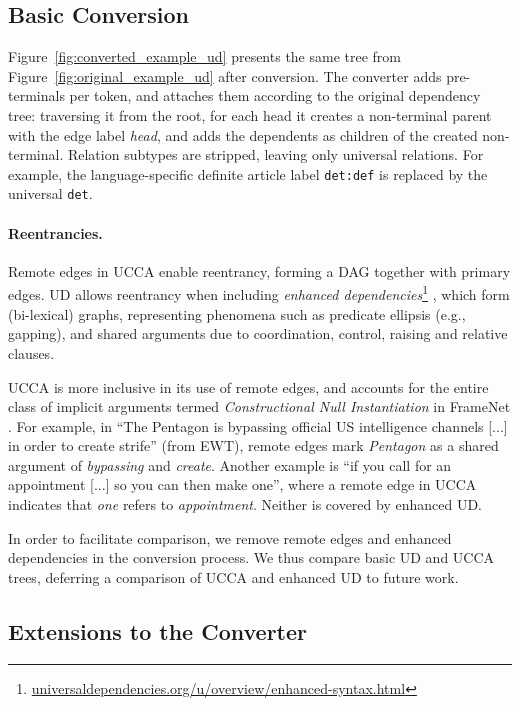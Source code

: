 \documentclass[11pt,a4paper]{article}
\begin{document}
\subsection{Basic Conversion}\label{sec:conversion}

Figure~\ref{fig:converted_example_ud} presents the same tree from Figure~\ref{fig:original_example_ud}
after conversion.
The converter adds pre-terminals per token,
and attaches them according to the original dependency tree:
traversing it from the root, for each head it creates a non-terminal
parent with the edge label {\it head}, and adds the dependents as children of 
the created non-terminal.
Relation subtypes are stripped,
leaving only universal relations.
For example, the language-specific definite article label
\texttt{det:def} is replaced by the universal \texttt{det}.

\paragraph{Reentrancies.}
Remote edges in UCCA enable reentrancy, forming a DAG together with primary edges.
UD allows reentrancy when including \textit{enhanced dependencies}\footnote{\url{universaldependencies.org/u/overview/enhanced-syntax.html}}
\cite{SCHUSTER16.779}, which form (bi-lexical) graphs, representing phenomena
such as predicate ellipsis (e.g., gapping),
and shared arguments due to coordination, control, raising and relative clauses.

UCCA is more inclusive in its use of remote edges, and accounts for 
the entire class of implicit arguments termed {\it Constructional Null Instantiation} in FrameNet \citep{Ruppenhofer:16}.
For example, in
``The Pentagon is bypassing official US intelligence channels [...] in order to create strife'' (from EWT),
remote edges mark \textit{Pentagon} as a shared argument of \textit{bypassing} and
\textit{create}. 
Another example is ``if you call for an appointment [...] so you can then make one'',
where a remote edge in UCCA indicates that \textit{one} refers to \textit{appointment}.
Neither is covered by enhanced UD.

In order to facilitate comparison, we remove remote edges and enhanced dependencies in the conversion process.
We thus compare basic UD and UCCA trees, deferring a comparison of UCCA and enhanced UD to future work.



\subsection{Extensions to the Converter}\label{sec:local}
\end{document}
